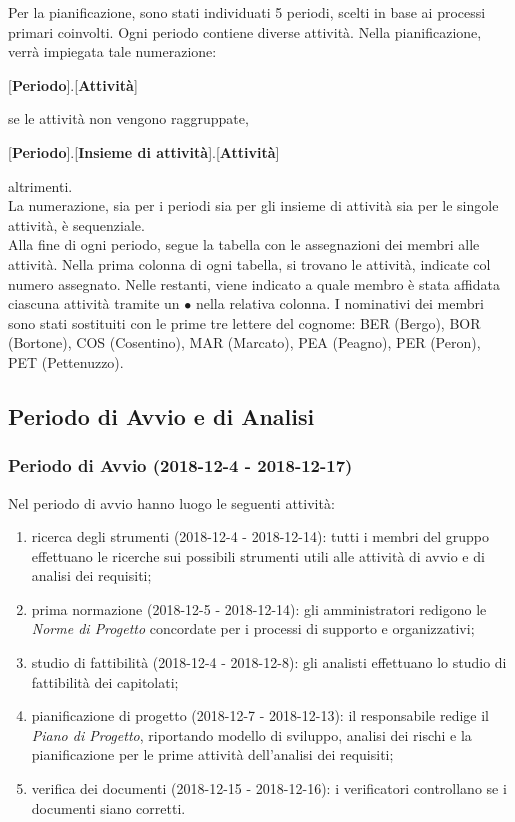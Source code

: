 Per la pianificazione, sono stati individuati 5 periodi, scelti in base ai processi primari coinvolti. Ogni periodo contiene diverse attività. Nella pianificazione, verrà impiegata tale numerazione:
\begin{center}
	[\textbf{Periodo}].[\textbf{Attività}]
\end{center}
se le attività non vengono raggruppate,
\begin{center}
	[\textbf{Periodo}].[\textbf{Insieme di attività}].[\textbf{Attività}]
\end{center}
altrimenti.\\
La numerazione, sia per i periodi sia per gli insieme di attività sia per le singole attività, è sequenziale.\\
Alla fine di ogni periodo, segue la tabella con le assegnazioni dei membri alle attività. Nella prima colonna di ogni tabella, si trovano le attività, indicate col numero assegnato. Nelle restanti, viene indicato a quale membro è stata affidata ciascuna attività tramite un $\bullet$ nella relativa colonna. I nominativi dei membri sono stati sostituiti con le prime tre lettere del cognome: BER (Bergo), BOR (Bortone), COS (Cosentino), MAR (Marcato), PEA (Peagno), PER (Peron), PET (Pettenuzzo).

\subsection{Periodo di Avvio e di Analisi}
	\subsubsection{Periodo di Avvio (2018-12-4 - 2018-12-17)}
		Nel periodo di avvio hanno luogo le seguenti attività:
		\begin{enumerate}[label = 1.\arabic*)]
			\item ricerca degli strumenti (2018-12-4 - 2018-12-14): tutti i membri del gruppo effettuano le ricerche sui possibili strumenti utili alle attività di avvio e di analisi dei requisiti;
			\item prima normazione (2018-12-5 - 2018-12-14): gli amministratori redigono le \textit{Norme di Progetto} concordate per i processi di supporto e organizzativi;
			\item studio di fattibilità (2018-12-4 - 2018-12-8): gli analisti effettuano lo studio di fattibilità dei capitolati;
			\item pianificazione di progetto (2018-12-7 - 2018-12-13): il responsabile redige il \textit{Piano di Progetto}, riportando modello di sviluppo, analisi dei rischi e la pianificazione per le prime attività dell'analisi dei requisiti;
			\item verifica dei documenti (2018-12-15 - 2018-12-16): i verificatori controllano se i documenti siano corretti.
		\end{enumerate}
		
